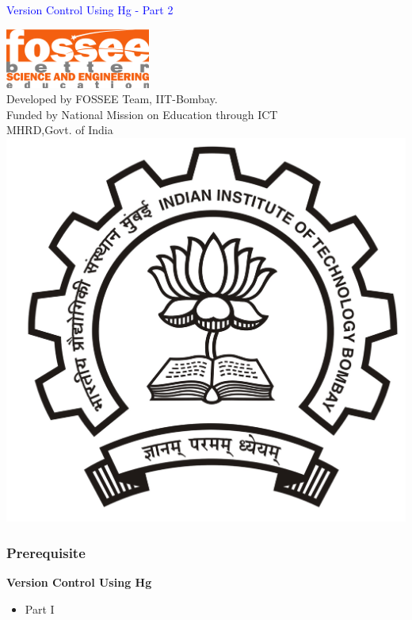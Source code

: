 \documentclass[14pt,compress]{beamer}
\begin{document}
\begin{frame}

\begin{center}
\vspace{12pt}
\textcolor{blue}{\huge Version Control Using Hg - Part 2}
\end{center}
\vspace{18pt}
\begin{center}
\vspace{10pt}
\includegraphics[scale=0.95]{../images/fossee-logo.png}\\
\vspace{5pt}
\scriptsize Developed by FOSSEE Team, IIT-Bombay. \\ 
\scriptsize Funded by National Mission on Education through ICT\\
\scriptsize  MHRD,Govt. of India\\
\includegraphics[scale=0.15]{../images/iitb-logo.jpg}\\
\end{center}
\end{frame}

\begin{frame}
	\frametitle{Prerequisite}
	\textbf{Version Control Using Hg}
	\begin{itemize}
	\item Part I
	\end{itemize}
\end{frame}
\end{document}
